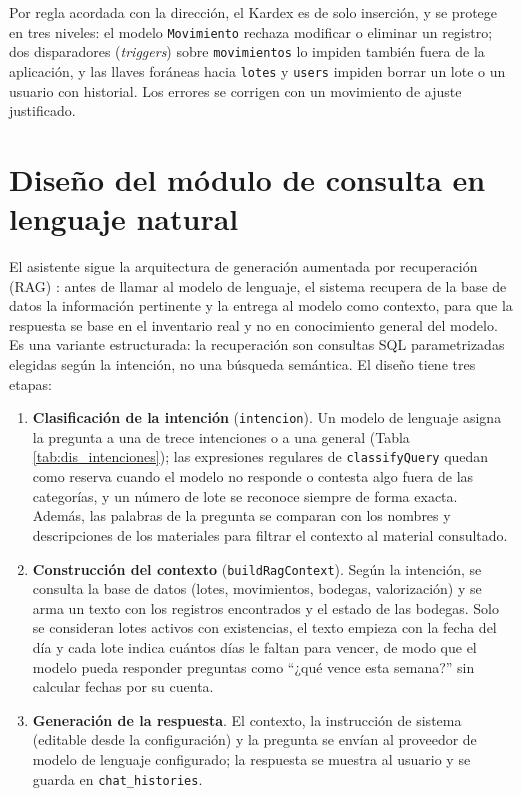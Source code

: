 Por regla acordada con la dirección, el Kardex es de solo inserción, y se protege en tres niveles: el modelo \texttt{Movimiento} rechaza modificar o eliminar un registro; dos disparadores (\textit{triggers}) sobre \texttt{movimientos} lo impiden también fuera de la aplicación, y las llaves foráneas hacia \texttt{lotes} y \texttt{users} impiden borrar un lote o un usuario con historial. Los errores se corrigen con un movimiento de ajuste justificado.

\section{Diseño del módulo de consulta en lenguaje natural}
\label{sec:dis_rag}

El asistente sigue la arquitectura de generación aumentada por recuperación (RAG) \cite{rag_lewis2020}: antes de llamar al modelo de lenguaje, el sistema recupera de la base de datos la información pertinente y la entrega al modelo como contexto, para que la respuesta se base en el inventario real y no en conocimiento general del modelo. Es una variante estructurada: la recuperación son consultas SQL parametrizadas elegidas según la intención, no una búsqueda semántica. El diseño tiene tres etapas:

\begin{enumerate}
    \item \textbf{Clasificación de la intención} (\texttt{intencion}). Un modelo de lenguaje asigna la pregunta a una de trece intenciones o a una general (Tabla \ref{tab:dis_intenciones}); las expresiones regulares de \texttt{classifyQuery} quedan como reserva cuando el modelo no responde o contesta algo fuera de las categorías, y un número de lote se reconoce siempre de forma exacta. Además, las palabras de la pregunta se comparan con los nombres y descripciones de los materiales para filtrar el contexto al material consultado.
    \item \textbf{Construcción del contexto} (\texttt{buildRagContext}). Según la intención, se consulta la base de datos (lotes, movimientos, bodegas, valorización) y se arma un texto con los registros encontrados y el estado de las bodegas. Solo se consideran lotes activos con existencias, el texto empieza con la fecha del día y cada lote indica cuántos días le faltan para vencer, de modo que el modelo pueda responder preguntas como ``¿qué vence esta semana?'' sin calcular fechas por su cuenta.
    \item \textbf{Generación de la respuesta}. El contexto, la instrucción de sistema (editable desde la configuración) y la pregunta se envían al proveedor de modelo de lenguaje configurado; la respuesta se muestra al usuario y se guarda en \texttt{chat\_histories}.
\end{enumerate}

